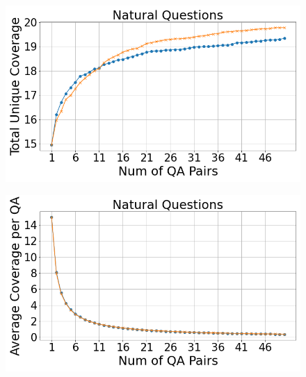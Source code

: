 \documentclass[11pt]{article}
\begin{document}
\begin{figure}[h!]
\begin{minipage}[h]{0.33\linewidth}
    \label{fig:triviaqa-entropy}
    \end{minipage}

    \begin{minipage}[h]{0.33\linewidth}
        \centering
        \includegraphics[width=\textwidth]{submissions/Tung2023/figs/Natural Questions_Total Unique Coverage.png}
    \label{fig:narrativeqa-total-unique-coverage}
    \end{minipage}
    \begin{minipage}[h]{0.33\linewidth}
        \centering
        \includegraphics[width=\textwidth]{submissions/Tung2023/figs/Natural Questions_Average Coverage per QA.png}
    \label{fig:narrativeqa-avg-cov-per-qa}
    \end{minipage}
    \begin{minipage}[h]{0.33\linewidth}
        \centering

\end{minipage}
\end{figure}
\end{document}
